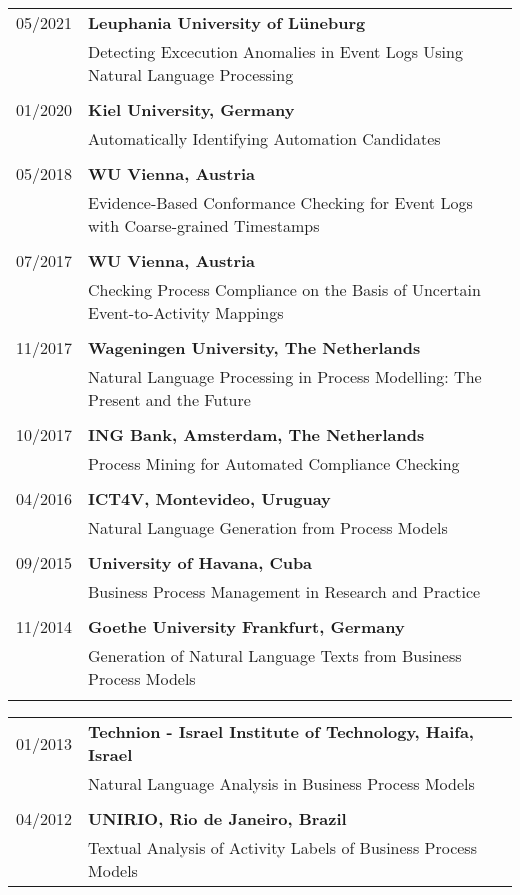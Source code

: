 \raggedright
\begin{tabular}{P{3cm}P{12cm}}

05/2021	& \textbf{Leuphania University of Lüneburg} \\
				& Detecting Excecution Anomalies in Event Logs Using Natural Language Processing \\
\\
01/2020		& \textbf{Kiel University, Germany} \\
					& Automatically Identifying Automation Candidates \\
					\\
05/2018		& 	\textbf{WU Vienna, Austria} \\
					& Evidence-Based Conformance Checking for Event Logs with Coarse-grained Timestamps \\
					\\
07/2017		& \textbf{WU Vienna, Austria} \\
					& Checking Process Compliance on the Basis of Uncertain Event-to-Activity Mappings \\
					\\
	
11/2017		& \textbf{Wageningen University, The Netherlands} \\
					& Natural Language Processing in Process Modelling: The Present and the Future \\
\\			
10/2017		& \textbf{ING Bank, Amsterdam, The Netherlands} \\
					& Process Mining for Automated Compliance Checking \\
					\\

04/2016		& \textbf{ICT4V, Montevideo, Uruguay} \\
					& Natural Language Generation from Process Models \\
					\\

09/2015		& \textbf{University of Havana, Cuba} \\
					& Business Process Management in Research and Practice \\
					\\
11/2014		& \textbf{Goethe University Frankfurt, Germany} \\
					& Generation of Natural Language Texts from Business Process Models \\
					\\
																												\end{tabular}
\begin{tabular}{P{3cm}P{12cm}}	
01/2013		& \textbf{Technion - Israel Institute of Technology, Haifa, Israel} \\
					& Natural Language Analysis in Business Process Models \\
					\\
04/2012		& \textbf{UNIRIO, Rio de Janeiro, Brazil} \\
					& Textual Analysis of Activity Labels of Business Process Models \\
\end{tabular}
